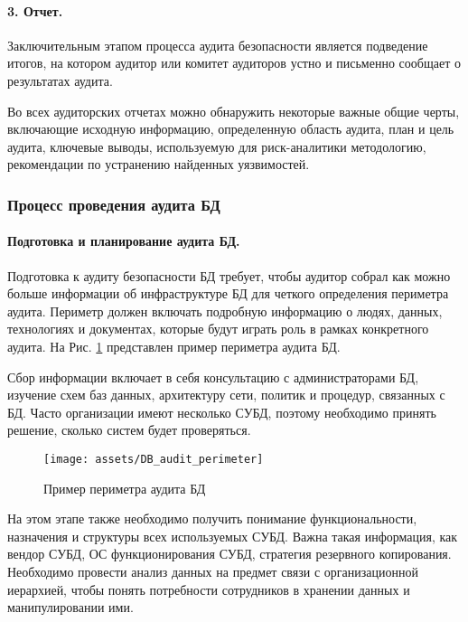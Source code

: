 \paragraph{3. Отчет.}

Заключительным этапом процесса аудита безопасности является подведение итогов, на котором аудитор или комитет аудиторов устно и письменно сообщает о результатах аудита.

Во всех аудиторских отчетах можно обнаружить некоторые важные общие черты, включающие исходную информацию, определенную область аудита, план и цель аудита, ключевые выводы, используемую для риск-аналитики методологию, рекомендации по устранению найденных уязвимостей.

\subsubsection{Процесс проведения аудита БД}

\paragraph{Подготовка и планирование аудита БД.}

Подготовка к аудиту безопасности БД требует, чтобы аудитор собрал как можно больше информации об инфраструктуре БД для четкого определения периметра аудита. Периметр должен включать подробную информацию о людях, данных, технологиях и документах, которые будут играть роль в рамках конкретного аудита. На Рис. \ref{fig:DB_audit_perimeter} представлен пример периметра аудита БД.

Сбор информации включает в себя консультацию с администраторами БД, изучение схем баз данных, архитектуру сети, политик и процедур, связанных с БД. Часто организации имеют несколько СУБД, поэтому необходимо принять решение, сколько систем будет проверяться.

\begin{figure}[h!]
    \centering
    \texttt{[image: assets/DB\_audit\_perimeter]}
    \caption{Пример периметра аудита БД}
	\label{fig:DB_audit_perimeter}
\end{figure}

На этом этапе также необходимо получить понимание функциональности, назначения и структуры всех используемых СУБД. Важна такая информация, как вендор СУБД, ОС функционирования СУБД, стратегия резервного копирования. Необходимо провести анализ данных на предмет связи с организационной иерархией, чтобы понять потребности сотрудников в хранении данных и манипулировании ими.


